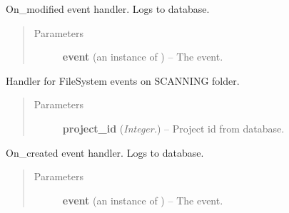 \documentclass[letterpaper,10pt,english]{sphinxmanual}
\begin{document}
\begin{fulllineitems}
\begin{fulllineitems}
\label{api:controller.PROJECT_FILE_EVENT_HANDLER.on_modified}
On\_modified event handler. Logs to database.
\begin{quote}\begin{description}
\item[{Parameters}] \leavevmode
\textbf{event} (an instance of ) -- The event.

\end{description}\end{quote}

\end{fulllineitems}


\end{fulllineitems}


\begin{fulllineitems}
\label{api:controller.SCAN_HANDLER}
Handler for FileSystem events on SCANNING folder.
\begin{quote}\begin{description}
\item[{Parameters}] \leavevmode
\textbf{project\_id} (\emph{Integer.}) -- Project id from database.

\end{description}\end{quote}

\begin{fulllineitems}
\label{api:controller.SCAN_HANDLER.on_created}
On\_created event handler. Logs to database.
\begin{quote}\begin{description}
\item[{Parameters}] \leavevmode
\textbf{event} (an instance of ) -- The event.

\end{description}\end{quote}

\end{fulllineitems}


\end{fulllineitems}
\end{document}
